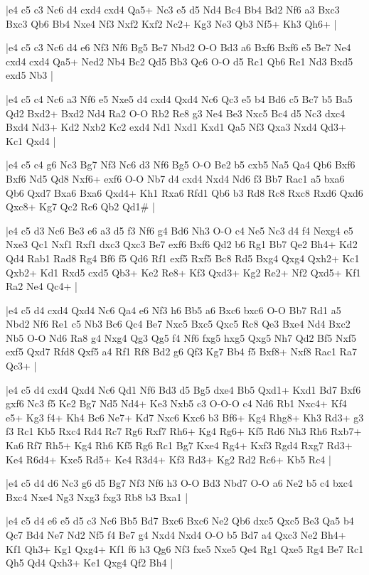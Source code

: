 \whitename{}
\blackname{}
\makegametitle
|e4 c5 c3 Nc6 d4 cxd4 cxd4 Qa5+ Nc3 e5 d5 Nd4 Bc4 Bb4 Bd2 Nf6 a3 Bxc3 Bxc3 Qb6 Bb4 Nxe4 Nf3 Nxf2 Kxf2 Nc2+ Kg3 Ne3 Qb3 Nf5+ Kh3 Qh6+  |

\whitename{}
\blackname{}
\makegametitle
|e4 c5 c3 Nc6 d4 e6 Nf3 Nf6 Bg5 Be7 Nbd2 O-O Bd3 a6 Bxf6 Bxf6 e5 Be7 Ne4 cxd4 cxd4 Qa5+ Ned2 Nb4 Bc2 Qd5 Bb3 Qc6 O-O d5 Rc1 Qb6 Re1 Nd3 Bxd5 exd5 Nb3  |

\whitename{}
\blackname{}
\makegametitle
|e4 c5 c4 Nc6 a3 Nf6 e5 Nxe5 d4 cxd4 Qxd4 Nc6 Qc3 e5 b4 Bd6 c5 Bc7 b5 Ba5 Qd2 Bxd2+ Bxd2 Nd4 Ra2 O-O Rb2 Re8 g3 Ne4 Be3 Nxc5 Bc4 d5 Nc3 dxc4 Bxd4 Nd3+ Kd2 Nxb2 Kc2 exd4 Nd1 Nxd1 Kxd1 Qa5 Nf3 Qxa3 Nxd4 Qd3+ Kc1 Qxd4  |

\whitename{}
\blackname{}
\makegametitle
|e4 c5 c4 g6 Nc3 Bg7 Nf3 Nc6 d3 Nf6 Bg5 O-O Be2 b5 cxb5 Na5 Qa4 Qb6 Bxf6 Bxf6 Nd5 Qd8 Nxf6+ exf6 O-O Nb7 d4 cxd4 Nxd4 Nd6 f3 Bb7 Rac1 a5 bxa6 Qb6 Qxd7 Bxa6 Bxa6 Qxd4+ Kh1 Rxa6 Rfd1 Qb6 b3 Rd8 Rc8 Rxc8 Rxd6 Qxd6 Qxc8+ Kg7 Qc2 Rc6 Qb2 Qd1\#  |

\whitename{}
\blackname{}
\makegametitle
|e4 c5 d3 Nc6 Be3 e6 a3 d5 f3 Nf6 g4 Bd6 Nh3 O-O c4 Ne5 Nc3 d4 f4 Nexg4 e5 Nxe3 Qc1 Nxf1 Rxf1 dxc3 Qxc3 Be7 exf6 Bxf6 Qd2 b6 Rg1 Bb7 Qe2 Bh4+ Kd2 Qd4 Rab1 Rad8 Rg4 Bf6 f5 Qd6 Rf1 exf5 Rxf5 Bc8 Rd5 Bxg4 Qxg4 Qxh2+ Kc1 Qxb2+ Kd1 Rxd5 cxd5 Qb3+ Ke2 Re8+ Kf3 Qxd3+ Kg2 Re2+ Nf2 Qxd5+ Kf1 Ra2 Ne4 Qc4+  |

\whitename{}
\blackname{}
\makegametitle
|e4 c5 d4 cxd4 Qxd4 Nc6 Qa4 e6 Nf3 h6 Bb5 a6 Bxc6 bxc6 O-O Bb7 Rd1 a5 Nbd2 Nf6 Re1 c5 Nb3 Bc6 Qc4 Be7 Nxc5 Bxc5 Qxc5 Rc8 Qe3 Bxe4 Nd4 Bxc2 Nb5 O-O Nd6 Ra8 g4 Nxg4 Qg3 Qg5 f4 Nf6 fxg5 hxg5 Qxg5 Nh7 Qd2 Bf5 Nxf5 exf5 Qxd7 Rfd8 Qxf5 a4 Rf1 Rf8 Bd2 g6 Qf3 Kg7 Bb4 f5 Bxf8+ Nxf8 Rac1 Ra7 Qc3+  |

\whitename{}
\blackname{}
\makegametitle
|e4 c5 d4 cxd4 Qxd4 Nc6 Qd1 Nf6 Bd3 d5 Bg5 dxe4 Bb5 Qxd1+ Kxd1 Bd7 Bxf6 gxf6 Nc3 f5 Ke2 Bg7 Nd5 Nd4+ Ke3 Nxb5 c3 O-O-O c4 Nd6 Rb1 Nxc4+ Kf4 e5+ Kg3 f4+ Kh4 Bc6 Ne7+ Kd7 Nxc6 Kxc6 b3 Bf6+ Kg4 Rhg8+ Kh3 Rd3+ g3 f3 Rc1 Kb5 Rxc4 Rd4 Rc7 Rg6 Rxf7 Rh6+ Kg4 Rg6+ Kf5 Rd6 Nh3 Rh6 Rxb7+ Ka6 Rf7 Rh5+ Kg4 Rh6 Kf5 Rg6 Rc1 Bg7 Kxe4 Rg4+ Kxf3 Rgd4 Rxg7 Rd3+ Ke4 R6d4+ Kxe5 Rd5+ Ke4 R3d4+ Kf3 Rd3+ Kg2 Rd2 Rc6+ Kb5 Rc4  |

\whitename{}
\blackname{}
\makegametitle
|e4 c5 d4 d6 Nc3 g6 d5 Bg7 Nf3 Nf6 h3 O-O Bd3 Nbd7 O-O a6 Ne2 b5 c4 bxc4 Bxc4 Nxe4 Ng3 Nxg3 fxg3 Rb8 b3 Bxa1  |

\whitename{}
\blackname{}
\makegametitle
|e4 c5 d4 e6 e5 d5 c3 Nc6 Bb5 Bd7 Bxc6 Bxc6 Ne2 Qb6 dxc5 Qxc5 Be3 Qa5 b4 Qc7 Bd4 Ne7 Nd2 Nf5 f4 Be7 g4 Nxd4 Nxd4 O-O b5 Bd7 a4 Qxc3 Ne2 Bh4+ Kf1 Qh3+ Kg1 Qxg4+ Kf1 f6 h3 Qg6 Nf3 fxe5 Nxe5 Qe4 Rg1 Qxe5 Rg4 Be7 Rc1 Qh5 Qd4 Qxh3+ Ke1 Qxg4 Qf2 Bh4  |

